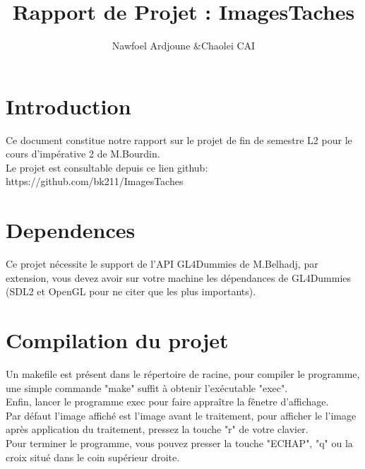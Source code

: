 \documentclass[12pt, letterpaper]{article}
\title{Rapport de Projet : ImagesTaches}
\author{Nawfoel Ardjoune \&Chaolei CAI}
\begin{document}
\begin{titlepage}
\maketitle
\end{titlepage}

\tableofcontents
\section{Introduction}
Ce document constitue notre rapport sur le projet de fin de semestre L2 pour le cours d'impérative 2 de M.Bourdin. \\
Le projet est consultable depuis ce lien github: https://github.com/bk211/ImagesTaches\\


\section{Dependences}
Ce projet nécessite le support de l'API GL4Dummies de M.Belhadj, 
par extension, vous devez avoir sur votre machine les dépendances de GL4Dummies 
(SDL2 et OpenGL pour ne citer que les plus importants).

\section{Compilation du projet}
Un makefile est présent dans le répertoire de racine, pour compiler le programme, une simple
commande "make" suffit à obtenir l'exécutable "exec".\\
Enfin, lancer le programme exec pour faire appraître la fênetre d'affichage.\\
Par défaut l'image affiché est l'image avant le traitement, 
pour afficher le l'image après application du traitement, pressez la touche "r" de votre clavier.\\
Pour terminer le programme, vous pouvez presser la touche "ECHAP", "q" ou la croix situé dans le coin supérieur droite.
\end{document}
